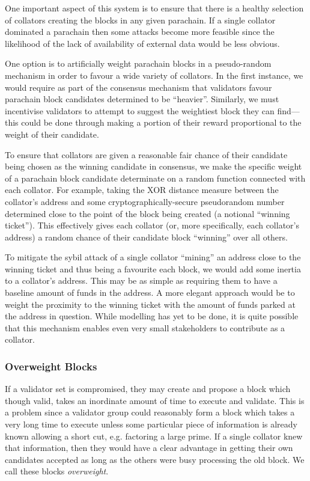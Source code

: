 \documentclass{beamer}
\makeatletter
\newcommand*\eg{e.g.\@\xspace}
\makeatother
\begin{document}
\begin{frame}
 One important aspect of this system is to ensure that there is a healthy selection of collators creating the blocks in any given parachain. If a single collator dominated a parachain then some attacks become more feasible since the likelihood of the lack of availability of external data would be less obvious.

 One option is to artificially weight parachain blocks in a pseudo-random mechanism in order to favour a wide variety of collators. In the first instance, we would require as part of the consensus mechanism that validators favour parachain block candidates determined to be ``heavier''. Similarly, we must incentivise validators to attempt to suggest the weightiest block they can find---this could be done through making a portion of their reward proportional to the weight of their candidate.

 To ensure that collators are given a reasonable fair chance of their candidate being chosen as the winning candidate in consensus, we make the specific weight of a parachain block candidate determinate on a random function connected
with each collator. For example, taking the {\small XOR} distance measure between the collator's address and some cryptographically-secure pseudorandom number determined close to the point of the block being created (a notional ``winning ticket''). This effectively gives each collator (or, more specifically, each collator's address) a random chance of their candidate block ``winning'' over all others.

 To mitigate the sybil attack of a single collator ``mining'' an address close to the winning ticket and thus being a favourite each block, we would add some inertia to a collator's address. This may be as simple as requiring them to have a baseline amount of funds in the address. A more elegant approach would be to weight the proximity to the winning ticket with the amount of funds parked at the address in question. While modelling has yet to be done, it is quite possible that this mechanism enables even very small stakeholders to contribute as a collator.
 
 \subsubsection{Overweight Blocks}
 
If a validator set is compromised, they may create and propose a block which though valid, takes an inordinate amount of time to execute and validate. This is a problem since a validator group could reasonably form a block which takes a very long time to execute unless some particular piece of information is already known allowing a short cut, \eg factoring a large prime. If a single collator knew that information, then they would have a clear advantage in getting their own candidates accepted as long as the others were busy processing the old block. We call these blocks \textit{overweight}.


\end{frame}
\end{document}
